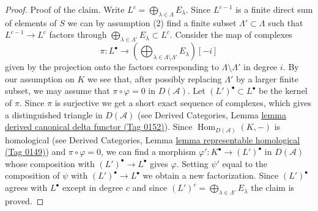 \documentclass{amsart}
\theoremstyle{plain}
\theoremstyle{definition}
\theoremstyle{remark}
\numberwithin{equation}{subsection}
\def\Hom{\mathop{\mathrm{Hom}}\nolimits}
\begin{document}
\begin{proof}
\medskip\noindent
Proof of the claim. Write $L^c = \bigoplus_{\lambda \in \Lambda} E_\lambda$.
Since $L^{c - 1}$ is a finite direct sum of elements of $S$
we can by assumption (2) find a finite subset
$\Lambda' \subset \Lambda$ such that $L^{c - 1} \to L^c$ factors
through $\bigoplus_{\lambda \in \Lambda'} E_\lambda \subset L^c$.
Consider the map of complexes
$$
\pi :
L^\bullet
\longrightarrow
(\bigoplus\nolimits_{\lambda \in \Lambda \setminus \Lambda'} E_\lambda)[-i]
$$
given by the projection onto the factors corresponding to
$\Lambda \setminus \Lambda'$ in degree $i$.
By our assumption on $K$ we see that, after possibly replacing $\Lambda'$ by
a larger finite subset, we may assume that $\pi \circ \varphi = 0$
in $D(\mathcal{A})$.
Let $(L')^\bullet \subset L^\bullet$ be the kernel of $\pi$.
Since $\pi$ is surjective we get a short exact sequence of complexes,
which gives a distinguished triangle in $D(\mathcal{A})$ (see
Derived Categories, Lemma \href{https://stacks.math.columbia.edu/tag/0152}{lemma derived canonical delta functor (Tag 0152)}).
Since $\Hom_{D(\mathcal{A})}(K, -)$ is homological (see
Derived Categories, Lemma \href{https://stacks.math.columbia.edu/tag/0149}{lemma representable homological (Tag 0149)})
and $\pi \circ \varphi = 0$, we can find a morphism
$\varphi' : K^\bullet \to (L')^\bullet$ in $D(\mathcal{A})$ whose
composition with $(L')^\bullet \to L^\bullet$ gives $\varphi$.
Setting $\psi'$ equal to the composition of $\psi$ with
$(L')^\bullet \to L^\bullet$ we obtain a new factorization.
Since $(L')^\bullet$ agrees with $L^\bullet$ except in degree $c$
and since $(L')^c = \bigoplus_{\lambda \in \Lambda'} E_\lambda$ the
claim is proved.
\end{proof}
\end{document}

